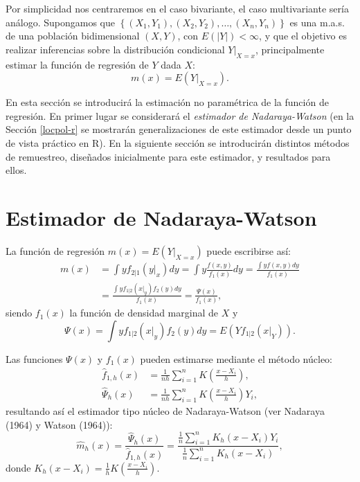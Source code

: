 \documentclass[
]{book}
\theoremstyle{break}
\theoremstyle{definition}
\theoremstyle{definition}
\theoremstyle{definition}
\theoremstyle{definition}
\theoremstyle{remark}
\begin{document}
Por simplicidad nos centraremos en el caso bivariante, el caso multivariante sería análogo.
Supongamos que \(\left\{ \left( X_1,Y_1 \right),\left( X_2,Y_2 \right), \ldots, \left( X_n,Y_n \right) \right\}\) es una m.a.s. de una población bidimensional \(\left( X,Y \right)\), con \(E\left( \left\vert Y\right\vert \right) <\infty\), y que el objetivo es realizar inferencias sobre la distribución condicional \(\left. Y \right\vert_{X=x}\), principalmente estimar la función de regresión de \(Y\) dada \(X\):
\[m\left( x \right) =E\left( \left. Y\right\vert_{X=x} \right).\]

En esta sección se introducirá la estimación no paramétrica de la función de regresión.
En primer lugar se considerará el \emph{estimador de Nadaraya-Watson} (en la Sección \ref{locpol-r} se mostrarán generalizaciones de este estimador desde un punto de vista práctico en R).
En la siguiente sección se introducirán distintos métodos de remuestreo, diseñados inicialmente para este estimador, y resultados para ellos.

\hypertarget{nadaraya-watson}{%
\section{Estimador de Nadaraya-Watson}\label{nadaraya-watson}}

La función de regresión \(m\left( x \right) =E\left( \left. Y\right\vert_{X=x} \right)\) puede escribirse así:
\[\begin{aligned}
m\left( x \right) &= \int yf_{2|1}\left( \left. y\right\vert _{x} \right)
dy=\int y\frac{f\left( x,y \right)}{f_1\left( x \right)}dy=\frac{\int
yf\left( x,y \right) dy}{f_1\left( x \right)} \\
&= \frac{\int yf_{1|2}\left( \left. x\right\vert _{y} \right) f_2\left(
y \right) dy}{f_1\left( x \right)}=\frac{\Psi \left( x \right)}{f_1\left(
x \right)},
\end{aligned}\]
siendo \(f_1\left( x \right)\) la función de densidad marginal de \(X\) y
\[\Psi \left( x \right) =\int yf_{1|2}\left( \left. x\right\vert _{y} \right)
f_2\left( y \right) dy=E\left( Yf_{1|2}\left( \left. x\right\vert_{Y} \right)
\right).\]

Las funciones \(\Psi \left( x \right)\) y \(f_1\left( x \right)\) pueden
estimarse mediante el método núcleo:
\[\begin{aligned}
\hat{f}_{1,h}\left( x \right) &= \frac{1}{nh}\sum_{i=1}^{n}K\left( \frac{
x-X_i}{h} \right), \\
\hat{\Psi}_{h}\left( x \right) &= \frac{1}{nh}\sum_{i=1}^{n}K\left( \frac{
x-X_i}{h} \right) Y_i,
\end{aligned}\]
resultando así el estimador tipo núcleo de Nadaraya-Watson
(ver Nadaraya (1964) y Watson (1964)):
\[\hat{m}_{h}\left( x \right) =\frac{\hat{\Psi}_{h}\left( x \right)}{\hat{f}
_{1,h}\left( x \right)}=\frac{\frac{1}{n}\sum_{i=1}^{n}K_{h}\left(
x-X_i \right) Y_i}{\frac{1}{n}\sum_{i=1}^{n}K_{h}\left( x-X_i \right)},\]
donde \(K_{h}\left( x-X_i \right) =\frac{1}{h}K\left( \frac{x-X_i}{h} \right)\).
\end{document}
